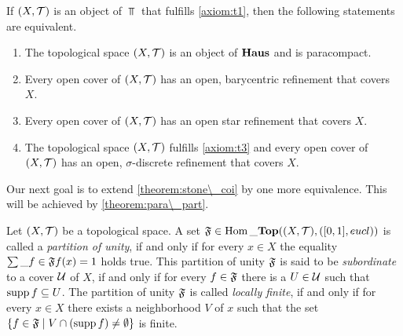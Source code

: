 \begin{theorem} \label{theorem:stone\_coi} \cite[p. 77]{Top}
	If $\tspace$ is an object of $\Top$ that fulfills \ref{axiom:t1}, then the following statements are equivalent.
	\begin{enumerate}
		\item The topological space $\tspace$ is an object of $\mathbf{Haus}$ and is paracompact.
		
		\item Every open cover of $\tspace$ has an open, barycentric refinement that covers $X$. 
		
		\item Every open cover of $\tspace$ has an open star refinement that covers $X$. 
		
		\item The topological space $\tspace$ fulfills \ref{axiom:t3} and every open cover of $\tspace$ has an open, $\sigma$-discrete refinement that covers $X$.
	\end{enumerate}
\end{theorem}

Our next goal is to extend \ref{theorem:stone\_coi} by one more equivalence. This will be achieved by \ref{theorem:para\_part}.

\begin{definition}
	Let $\tspace$ be a topological space. A set $\partition \in \Hom\_\Top\pbraces{\tspace, \pbraces{[0,1], \eucl}}$ is called a \textit{partition of unity}, if and only if for every $x \in X$ the equality $\sum\_{f \in \mathfrak{F}} f(x) = 1$ holds true. This partition of unity $\mathfrak{F}$ is said to be \textit{subordinate} to a cover $\mathcal{U}$ of $X$, if and only if for every $f \in \mathfrak{F}$ there is a $U \in \mathcal{U}$ such that $\operatorname{supp} f \subseteq U$. The partition of unity $\mathfrak{F}$ is called \textit{locally finite}, if and only if for every $x \in X$ there exists a neighborhood $V$ of $x$ such that the set ${\left \{ f \in \mathfrak{F} \mid V \cap {\left ( \operatorname{supp}f \right )} \neq \emptyset \right \}}$ is finite.
\end{definition}

